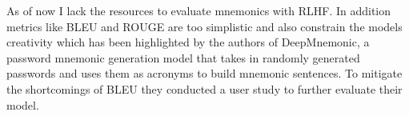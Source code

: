 As of now I lack the resources to evaluate mnemonics with RLHF. In addition metrics like BLEU and ROUGE are too simplistic and also constrain the models creativity which has been highlighted by the authors of DeepMnemonic, a password mnemonic generation model that takes in randomly generated passwords and uses them as acronyms to build mnemonic sentences. To mitigate the shortcomings of BLEU they conducted a user study to further evaluate their model.
